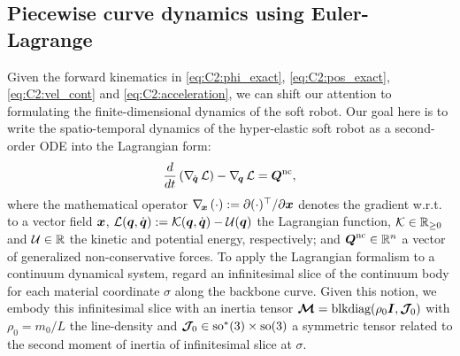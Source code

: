 \subsection{Piecewise curve dynamics using Euler-Lagrange}
\noindent Given the forward kinematics in \eqref{eq:C2:phi_exact}, \eqref{eq:C2:pos_exact}, \eqref{eq:C2:vel_cont} and \eqref{eq:C2:acceleration}, we can shift our attention to formulating the finite-dimensional dynamics of the soft robot. Our goal here is to write the spatio-temporal dynamics of the hyper-elastic soft robot as a second-order ODE into the Lagrangian form:
%
%
\begin{equation}
\frac{d}{d t}\left(\nabla_{\!{\dot{\boldsymbol{q}}}}\, \mathcal{L} \right) - \nabla_{\!{\boldsymbol{q}}}\, \mathcal{L} = \boldsymbol{Q}^{\textnormal{nc}}, \label{eq:C2:euler_largrange}
\end{equation}
%
\noindent where the mathematical operator $\nabla_{\!\boldsymbol{x}}\, (\cdot) := \partial(\cdot)^\top/\partial \boldsymbol{x}$ denotes the gradient w.r.t. to a vector field ${\boldsymbol{x}}$, $\mathcal{L}({\boldsymbol{q}},{\dot{\boldsymbol{q}}}) := \mathcal{K}({\boldsymbol{q}},{\dot{\boldsymbol{q}}}) - \mathcal{U}({\boldsymbol{q}})$ the Lagrangian function, $\mathcal{K} \in \mathbb{R}_{\ge0}$ and $\mathcal{U}\in \mathbb{R}$ the kinetic and potential energy, respectively; and
$\boldsymbol{Q}^{\textnormal{nc}} \in \mathbb{R}^n$ a vector of generalized non-conservative forces. To apply the Lagrangian formalism to a continuum dynamical system, regard an infinitesimal slice of the continuum body for each material coordinate $\sigma$ along the backbone curve. Given this notion, we embody this infinitesimal slice with an inertia tensor $
\boldsymbol{\mathcal{M}} = \text{blkdiag}(\rho_0 \boldsymbol{I},\boldsymbol{\mathcal{J}}_{\!0})$ with $\rho_0 = m_0/L$ the line-density and $\boldsymbol{\mathcal{J}}_{\!0} \in \textup{\textrm{so}}^*(3) \times \textup{\textrm{so}}(3)$ a symmetric tensor related to the second moment of inertia of infinitesimal slice at $\sigma$.

